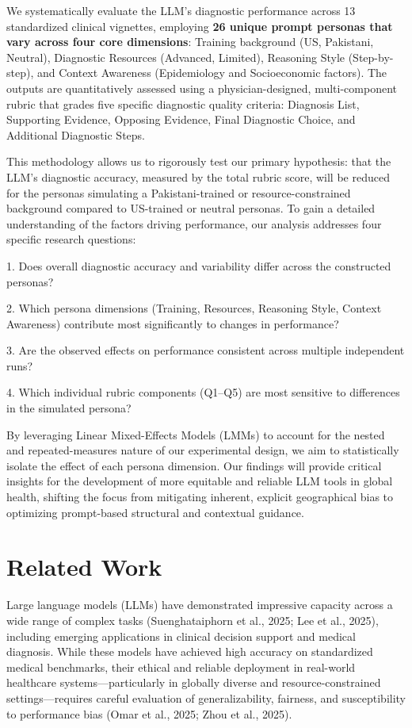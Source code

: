 \documentclass[sigconf]{acmart}
\begin{document}
We systematically evaluate the LLM's diagnostic performance across 13 standardized clinical vignettes, employing \textbf{26 unique prompt personas that vary across four core dimensions}: Training background (US, Pakistani, Neutral), Diagnostic Resources (Advanced, Limited), Reasoning Style (Step-by-step), and Context Awareness (Epidemiology and Socioeconomic factors). The outputs are quantitatively assessed using a physician-designed, multi-component rubric that grades five specific diagnostic quality criteria: Diagnosis List, Supporting Evidence, Opposing Evidence, Final Diagnostic Choice, and Additional Diagnostic Steps.

This methodology allows us to rigorously test our primary hypothesis: that the LLM's diagnostic accuracy, measured by the total rubric score, will be reduced for the personas simulating a Pakistani-trained or resource-constrained background compared to US-trained or neutral personas. To gain a detailed understanding of the factors driving performance, our analysis addresses four specific research questions:

1.	Does overall diagnostic accuracy and variability differ across the constructed personas?

2.	Which persona dimensions (Training, Resources, Reasoning Style, Context Awareness) contribute most significantly to changes in performance?

3.	Are the observed effects on performance consistent across multiple independent runs?

4.	Which individual rubric components (Q1–Q5) are most sensitive to differences in the simulated persona?

By leveraging Linear Mixed-Effects Models (LMMs) to account for the nested and repeated-measures nature of our experimental design, we aim to statistically isolate the effect of each persona dimension. Our findings will provide critical insights for the development of more equitable and reliable LLM tools in global health, shifting the focus from mitigating inherent, explicit geographical bias to optimizing prompt-based structural and contextual guidance.
\raggedbottom
\section{Related Work}

Large language models (LLMs) have demonstrated impressive capacity across a wide range of complex tasks (Suenghataiphorn et al., 2025; Lee et al., 2025), including emerging applications in clinical decision support and medical diagnosis. While these models have achieved high accuracy on standardized medical benchmarks, their ethical and reliable deployment in real-world healthcare systems—particularly in globally diverse and resource-constrained settings—requires careful evaluation of generalizability, fairness, and susceptibility to performance bias (Omar et al., 2025; Zhou et al., 2025).
\end{document}
